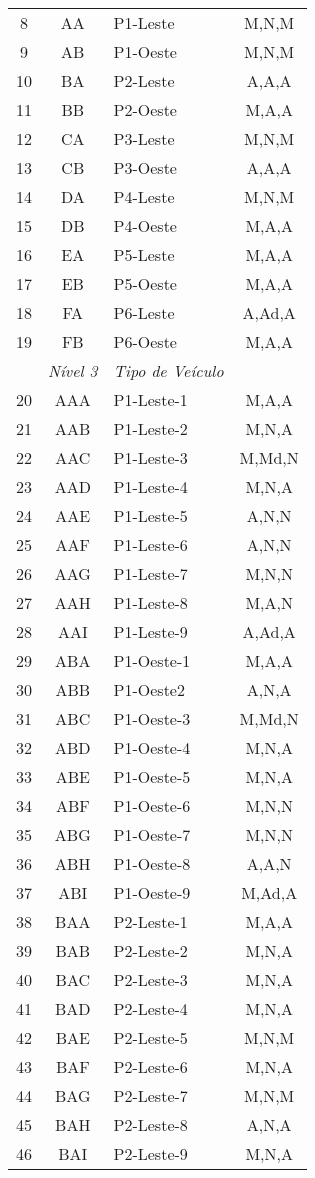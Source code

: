 \documentclass[
	12pt,				%
	openright,			%
	twoside,			%
	a4paper,			%
	english,			%
	french,				%
	spanish,			%
	brazil				%
	]{abntex2}
\begin{document}
\begin{apendicesenv}
\begin{longtable} {| c c l c |}
8 & AA & P1-Leste & M,N,M\\
9 & AB & P1-Oeste & M,N,M\\
10 & BA & P2-Leste & A,A,A\\
11 & BB & P2-Oeste & M,A,A\\
12 & CA & P3-Leste & M,N,M\\
13 & CB & P3-Oeste & A,A,A\\
14 & DA & P4-Leste & M,N,M\\
15 & DB & P4-Oeste & M,A,A\\
16 & EA & P5-Leste & M,A,A\\
17 & EB & P5-Oeste & M,A,A\\
18 & FA & P6-Leste & A,Ad,A\\
19 & FB & P6-Oeste & M,A,A\\


 & \emph{Nível 3} & \emph{Tipo de Veículo} &  \\


20 & AAA & P1-Leste-1 & M,A,A\\
21 & AAB & P1-Leste-2 & M,N,A\\
22 & AAC & P1-Leste-3 & M,Md,N\\
23 & AAD & P1-Leste-4 & M,N,A\\
24 & AAE & P1-Leste-5 & A,N,N\\
25 & AAF & P1-Leste-6 & A,N,N\\
26 & AAG & P1-Leste-7 & M,N,N\\
27 & AAH & P1-Leste-8 & M,A,N\\
28 & AAI & P1-Leste-9 & A,Ad,A\\


29 & ABA & P1-Oeste-1 & M,A,A\\
30 & ABB & P1-Oeste2 & A,N,A\\
31 & ABC & P1-Oeste-3 & M,Md,N\\
32 & ABD & P1-Oeste-4 & M,N,A\\
33 & ABE & P1-Oeste-5 & M,N,A\\
34 & ABF & P1-Oeste-6 & M,N,N\\
35 & ABG & P1-Oeste-7 & M,N,N\\
36 & ABH & P1-Oeste-8 & A,A,N\\
37 & ABI & P1-Oeste-9 & M,Ad,A\\


38 & BAA & P2-Leste-1 & M,A,A\\
39 & BAB & P2-Leste-2 & M,N,A\\
40 & BAC & P2-Leste-3 & M,N,A\\
41 & BAD & P2-Leste-4 & M,N,A\\
42 & BAE & P2-Leste-5 & M,N,M\\
43 & BAF & P2-Leste-6 & M,N,A\\
44 & BAG & P2-Leste-7 & M,N,M\\
45 & BAH & P2-Leste-8 & A,N,A\\
46 & BAI & P2-Leste-9 & M,N,A\\



\end{longtable}
\end{apendicesenv}
\end{document}
